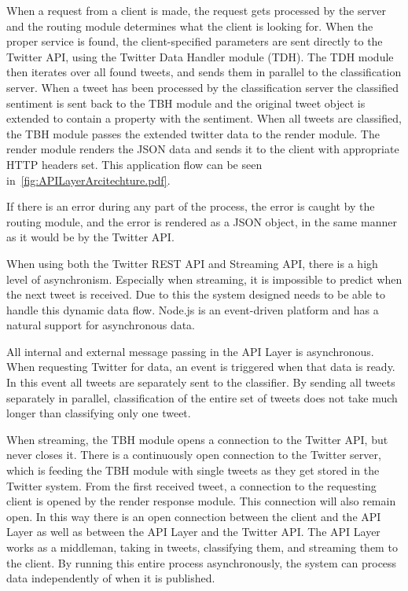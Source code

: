 When a request from a client is made, the request gets processed by the server and the routing module determines what the client is looking for. When the proper service is found, the client-specified parameters are sent directly to the Twitter API, using the Twitter Data Handler module (TDH). The TDH module then iterates over all found tweets, and sends them in parallel to the classification server. When a tweet has been processed by the classification server the classified sentiment is sent back to the TBH module and the original tweet object is extended to contain a property with the sentiment. When all tweets are classified, the TBH module passes the extended twitter data to the render module. The render module renders the JSON data and sends it to the client with appropriate HTTP headers set. This application flow can be seen in~\autoref{fig:APILayerArcitechture.pdf}.

If there is an error during any part of the process, the error is caught by the routing module, and the error is rendered as a JSON object, in the same manner as it would be by the Twitter API. 

When using both the Twitter REST API and Streaming API, there is a high level of asynchronism. Especially when streaming, it is impossible to predict when the next tweet is received. Due to this the system designed needs to be able to handle this dynamic data flow. Node.js is an event-driven platform and has a natural support for asynchronous data. 

All internal and external message passing in the API Layer is asynchronous. When requesting Twitter for data, an event is triggered when that data is ready. In this event all tweets are separately sent to the classifier. By sending all tweets separately in parallel, classification of the entire set of tweets does not take much longer than classifying only one tweet. 

When streaming, the TBH module opens a connection to the Twitter API, but never closes it. There is a continuously open connection to the Twitter server, which is feeding the TBH module with single tweets as they get stored in the Twitter system. From the first received tweet, a connection to the requesting client is opened by the render response module. This connection will also remain open. In this way there is an open connection between the client and the API Layer as well as between the API Layer and the Twitter API. The API Layer works as a middleman, taking in tweets, classifying them, and streaming them to the client. By running this entire process asynchronously, the system can process data independently of when it is published.


